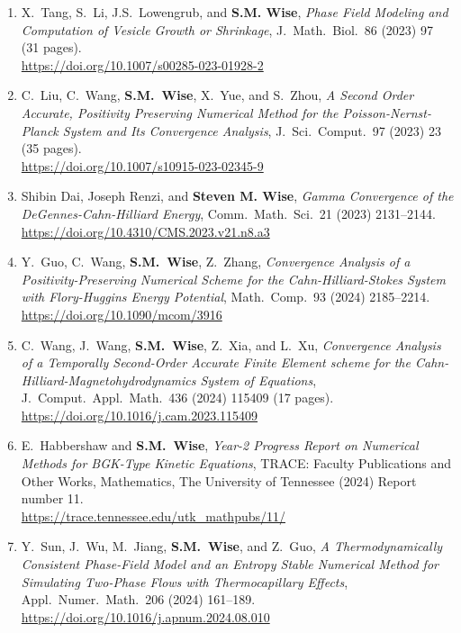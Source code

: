 \documentclass[11pt]{letter}
\begin{document}
\begin{enumerate}
	\item
X.~Tang, S.~Li, J.S.~Lowengrub, and \textbf{S.M. Wise}, {\sl Phase Field Modeling and Computation of Vesicle Growth or Shrinkage}, J.~Math.~Biol.~86 (2023) 97 (31 pages).
	\\
\url{https://doi.org/10.1007/s00285-023-01928-2}

	\item
C.~Liu, C.~Wang, \textbf{S.M.~Wise}, X.~Yue, and S.~Zhou, {\sl A Second Order Accurate, Positivity Preserving Numerical Method for the Poisson-Nernst-Planck System and Its Convergence Analysis}, J.~Sci.~Comput.~97 (2023) 23 (35 pages).
	\\
\url{https://doi.org/10.1007/s10915-023-02345-9}	

	\item
Shibin Dai, Joseph Renzi, and \textbf{Steven M. Wise}, {\sl Gamma Convergence of the DeGennes-Cahn-Hilliard Energy}, Comm.~Math.~Sci.~21 (2023) 2131--2144. 
	\\
\url{https://doi.org/10.4310/CMS.2023.v21.n8.a3}

	\item
Y.~Guo, C.~Wang, \textbf{S.M.~Wise}, Z.~Zhang, {\sl Convergence Analysis of a Positivity-Preserving Numerical Scheme for the Cahn-Hilliard-Stokes System with Flory-Huggins Energy Potential}, Math.~Comp.~93 (2024) 2185--2214.
	\\
\url{https://doi.org/10.1090/mcom/3916}

	\item
C.~Wang, J.~Wang, \textbf{S.M.~Wise}, Z.~Xia, and L.~Xu, {\sl Convergence Analysis of a Temporally Second-Order Accurate Finite Element scheme for the Cahn-Hilliard-Magnetohydrodynamics System of Equations}, J.~Comput.~Appl.~Math.~436 (2024) 115409 (17 pages).
	\\
\url{https://doi.org/10.1016/j.cam.2023.115409}

	\item
E.~Habbershaw and \textbf{S.M.~Wise}, {\sl Year-2 Progress Report on Numerical Methods for BGK-Type Kinetic Equations}, TRACE: Faculty Publications and Other Works, Mathematics, The University of Tennessee (2024) Report number 11.
 	\\
\url{https://trace.tennessee.edu/utk_mathpubs/11/}

	\item
Y.~Sun, J.~Wu, M.~Jiang, \textbf{S.M.~Wise}, and Z.~Guo, {\sl A Thermodynamically Consistent Phase-Field Model and an Entropy Stable Numerical Method for Simulating Two-Phase Flows with Thermocapillary Effects}, Appl.~Numer.~Math.~206 (2024) 161--189.
	\\
\url{https://doi.org/10.1016/j.apnum.2024.08.010}


\end{enumerate}
\end{document}
